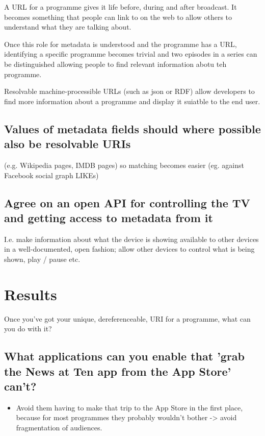 \documentclass[]{article}%
\begin{document}
A URL for a programme gives it life before, during and after broadcast. It becomes something that people can link to on the web to allow others to understand what they are talking about.

Once this role for metadata is understood and the programme has a URL, identifying a specific programme becomes trivial and two episodes in a series can be distinguished allowing people to find relevant information abotu teh programme.

Resolvable machine-processible URLs (such as json or RDF) allow developers to find more information about a programme and display it suiatble to the end user.

\subsection{Values of metadata fields should where possible also be resolvable URIs}

(e.g. Wikipedia pages, IMDB pages) so matching becomes easier (eg. against Facebook social graph LIKEs)

\subsection{Agree on an open API for controlling the TV and getting access to metadata from it}

I.e. make information about what the device is showing available to other devices in a well-documented, open fashion; allow other devices to control what is being shown, play / pause etc.


\section{Results}

Once you've got your unique, dereferenceable, URI for a programme, what can you do with it? 

\subsection{What applications can you enable that 'grab the News at Ten app from the App Store' can't?}

\begin{itemize}
\item{Avoid them having to make that trip to the App Store in the first place, because for most programmes they probably wouldn't bother -> avoid fragmentation of audiences. }
\end{itemize}
\end{document}

